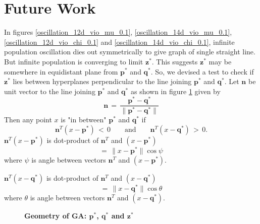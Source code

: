 \section{Future Work}
In figures \ref{oscillation_12d_vio_mu_0.1}, \ref{oscillation_14d_vio_mu_0.1}, 
\ref{oscillation_12d_vio_chi_0.1} and \ref{oscillation_14d_vio_chi_0.1},  
infinite population oscillation dies out symmetrically to 
give graph of single straight line. But infinite population is converging to limit $\bm{z}^\ast$. 
This suggests $\bm{z}^\ast$ may be somewhere in equidistant plane from $\bm{p}^\ast$ and $\bm{q}^\ast$.
So, we devised a test to check if $\bm{z}^\ast$ lies between hyperplanes perpendicular to the line 
joining $\bm{p}^\ast$ and $\bm{q}^\ast$. 
Let $\bm{n}$ be unit vector to the line joining $\bm{p}^\ast$ and $\bm{q}^\ast$ as shown in figure \ref{pqz} given by
\[
  \bm{n} \,=\, \frac{\bm{p}^\ast - \bm{q}^\ast}{\|\bm{p}^\ast-\bm{q}^\ast\|}
\]
Then any point $x$ is "in between" $\bm{p}^\ast$ and $\bm{q}^\ast$ if
\[
  \bm{n}^T(x-\bm{p}^\ast) \,<\, 0 \quad \quad \text{and} \quad \quad \bm{n}^T(x-\bm{q}^\ast) \,>\, 0.
\]
$\bm{n}^T(x-\bm{p}^\ast)$ is dot-product of $\bm{n}^T$ and $(x-\bm{p}^\ast)$
\[
  =\, \|x-\bm{p}^\ast\| \cos \psi
\]
where $\psi$ is angle between vectors $\bm{n}^T$ and $(x-\bm{p}^\ast)$.

$\bm{n}^T(x-\bm{q}^\ast)$ is dot-product of $\bm{n}^T$ and $(x-\bm{q}^\ast)$
\[
  =\, \|x-\bm{q}^\ast\| \cos \theta
\]
where $\theta$ is angle between vectors $\bm{n}^T$ and $(x-\bm{q}^\ast)$.

\begin{figure}[!ht]
\begin{center}
\hspace{-3em}%
\caption[\textbf{Geometry of GA:  $\bm{p}^\ast$, $\bm{q}^\ast$ and $\bm{z}^\ast$}]
{\textbf{Geometry of GA:  $\bm{p}^\ast$, $\bm{q}^\ast$ and $\bm{z}^\ast$}}
\label{pqz}
\end{center}
\end{figure}


